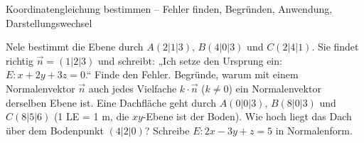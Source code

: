\begin{aufgabe}{Koordinatengleichung bestimmen – Fehler finden, Begründen, Anwendung, Darstellungswechsel}
\begin{teile}
\teil Nele bestimmt die Ebene durch $A(2 | 1 | 3)$, $B(4 | 0 | 3)$ und $C(2 | 4 | 1)$. Sie findet richtig $\vec n = (1 | 2 | 3)$ und schreibt: „Ich setze den Ursprung ein: $E\colon x + 2y + 3z = 0$.“ Finde den Fehler.
\teil Begründe, warum mit einem Normalenvektor $\vec n$ auch jedes Vielfache $k \cdot \vec n$ ($k \ne 0$) ein Normalenvektor derselben Ebene ist.
\teil Eine Dachfläche geht durch $A(0 | 0 | 3)$, $B(8 | 0 | 3)$ und $C(8 | 5 | 6)$ (1 LE = 1 m, die $xy$-Ebene ist der Boden). Wie hoch liegt das Dach über dem Bodenpunkt $(4 | 2 | 0)$?
\teil Schreibe $E\colon 2x - 3y + z = 5$ in Normalenform.
\end{teile}
\end{aufgabe}

